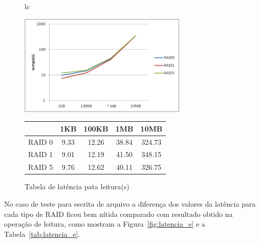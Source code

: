 	\begin{figure}[h]
		\begin{tabular}{lc}
			\begin{minipage}{.50\textwidth}
				\begin{center}
					
					\includegraphics[clip,width=8.0cm]{images/resultados/latencia_leitura.png}
					\caption{Gráfico de latência pata leitura}
					\label{fig:latencia_l}
					
				\end{center}
				
			\end{minipage}
			
			\begin{minipage}{.5\textwidth}
				\makeatletter
				\def\@captype{table}
				\makeatother
				\caption{Tabela de latência pata leitura(s)}
				\label{tab:latencia_l}
				\begin{center}
					\begin{tabular}{|c|c|c|c|c|} \hline
								& 1KB  & 100KB & 1MB   & 10MB  \\ \hline
						RAID 0	& 9.33 & 12.26 & 38.84 & 324.73\\ \hline
						RAID 1	& 9.01 & 12.19 & 41.50 & 348.15\\ \hline
						RAID 5	& 9.76 & 12.62 & 40.11 & 326.75\\ \hline
						
						
					\end{tabular}
				\end{center}
				
			\end{minipage}
		\end{tabular}
	\end{figure}
	
	
	
	No caso de teste para escrita de arquivo a diferença dos valores da latência para cada tipo de RAID ficou bem nítida comparado com resultado obtido na operação de leitura, como mostram a Figura~\ref{fig:latencia_e} e a Tabela~\ref{tab:latencia_e}.
	\\
	
